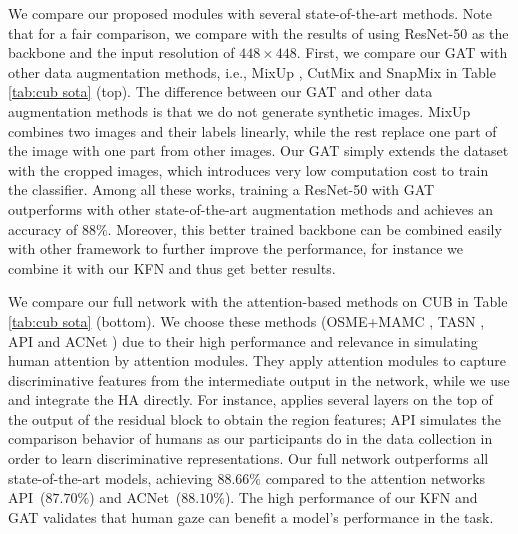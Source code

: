 \documentclass{bmvc2k}
\begin{document}
We compare our proposed modules with several state-of-the-art methods. Note that for a fair comparison, we compare with the results of using ResNet-50 as the backbone and the input resolution of $448 \times 448$. First, we compare our GAT with other data augmentation methods, i.e., MixUp \cite{zhang2017mixup}, CutMix \cite{yun2019cutmix} and SnapMix \cite{huang2020snapmix} in Table \ref{tab:cub sota} (top). 
The difference between our GAT and other data augmentation methods is that we do not generate synthetic images. MixUp combines two images and their labels linearly, while the rest replace one part of the image with one part from other images. Our GAT simply extends the dataset with the cropped images, which introduces very low computation cost to train the classifier. Among all these works, training a ResNet-50 with GAT outperforms with other state-of-the-art augmentation methods and achieves an accuracy of $88\%$. Moreover, this better trained backbone can be combined easily with other framework to further improve the performance, for instance we combine it with our KFN and thus get better results. 




\begin{table}[b]
\vspace{-0.3cm}
\begin{center}
\end{center}
\caption{Combining our GAT model with the state-of-the-art methods on CUB.}
\label{tab:combi}
\end{table}

We compare our full network with the attention-based methods on CUB in Table \ref{tab:cub sota} (bottom). We choose these methods (OSME+MAMC \cite{sun2018multi}, TASN \cite{zheng2019looking}, API \cite{zhuang2020learning} and ACNet \cite{ji2020attention}) due to their high performance and relevance in simulating human attention by attention modules. They apply attention modules to capture discriminative features from the intermediate output in the network, while we use and integrate the HA directly. 
For instance, \cite{sun2018multi,ji2020attention} applies several layers on the top of the output of the residual block to obtain the region features; API \cite{zhuang2020learning} simulates the comparison behavior of humans as our participants do in the data collection in order to learn discriminative representations. 
Our full network outperforms all state-of-the-art models, achieving $88.66\%$ compared to the attention networks API~($87.70\%$) and ACNet~($88.10\%$). The high performance of our KFN and GAT validates that human gaze can benefit a model's performance in the task.
\end{document}
